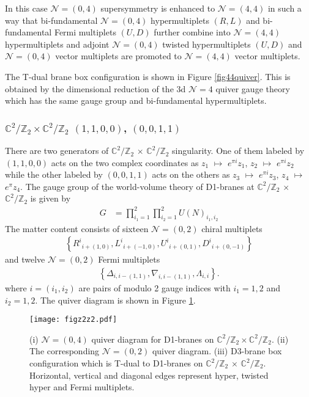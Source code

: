 \documentclass{article}
\numberwithin{equation}{section}
\begin{document}
In this case $\mathcal{N}=(0,4)$ supersymmetry is enhanced to $\mathcal{N}=(4,4)$ 
in such a way that  bi-fundamental $\mathcal{N}=(0,4)$ hypermultiplets 
$(R,L)$ and bi-fundamental Fermi multiplets $(U, D)$ further combine into $\mathcal{N}=(4,4)$ hypermultiplets 
and adjoint $\mathcal{N}=(0,4)$ twisted hypermultiplets $(U,D)$ and 
$\mathcal{N}=(0,4)$ vector multiplets are promoted to $\mathcal{N}=(4,4)$ vector multiplets. 

The T-dual brane box configuration is shown in Figure \ref{fig44quiver}. 
This is obtained by the dimensional reduction of the 3d $\mathcal{N}=4$ quiver gauge theory 
which has the same gauge group and bi-fundamental hypermultiplets. 








\subsubsection{$\mathbb{C}^{2}/\mathbb{Z}_{2}\times \mathbb{C}^{2}/\mathbb{Z}_{2}$ $(1,1,0,0)$, $(0,0,1,1)$}
\label{subsec_d1zkzk}
There are two generators of $\mathbb{C}^{2}/\mathbb{Z}_{2}$ 
$\times$ $\mathbb{C}^{2}/\mathbb{Z}_{2}$ singularity. 
One of them labeled by $(1,1,0,0)$ acts on the two complex coordinates as 
$z_{1}$ $\mapsto$ $e^{\pi i}z_{1}$, $z_{2}$ $\mapsto$ $e^{\pi i}z_{2}$ 
while the other labeled by $(0,0,1,1)$ acts on the others as
$z_{3}$ $\mapsto$ $e^{\pi i}z_{3}$, $z_{4}$ $\mapsto$ $e^{\pi} z_{4}$. 
The gauge group of the world-volume theory of D1-branes at $\mathbb{C}^{2}/\mathbb{Z}_{2}$ $\times$ 
$\mathbb{C}^{2}/\mathbb{Z}_{2}$ is given by 
\begin{align}
\label{z2z2_G}
G&=\prod_{i_{1}=1}^{2}\prod_{i_{2}=1}^{2}U(N)_{i_{1},i_{2}}
\end{align}
The matter content consists of sixteen $\mathcal{N}=(0,2)$ chiral multiplets
\begin{align}
\label{z2z2content}
\left\{
{R^{i}}_{i+(1,0)}, {L^{i}}_{i+(-1,0)}, {U^{i}}_{i+(0,1)}, {D^{i}}_{i+(0,-1)}
\right\}
\end{align}
and twelve $\mathcal{N}=(0,2)$ Fermi multiplets 
\begin{align}
\label{z2z2content}
\left\{
\Delta_{i,i-(1,1)}, \nabla_{i,i-(1,1)}, \Lambda_{i,i}
\right\}. 
\end{align}
where $i=(i_{1},i_{2})$ are pairs of modulo 2 gauge indices with $i_{1}=1,2$ and $i_{2}=1,2$. 
The quiver diagram is shown in Figure \ref{figz2z2}. 
\begin{figure}
\begin{center}
\texttt{[image: figz2z2.pdf]}
\caption{
(i) $\mathcal{N}=(0,4)$ quiver diagram for D1-branes on $\mathbb{C}^{2}/\mathbb{Z}_{2}\times \mathbb{C}^{2}/\mathbb{Z}_{2}$. 
(ii) The corresponding $\mathcal{N}=(0,2)$ quiver diagram. 
(iii) D3-brane box configuration which is T-dual to D1-branes on 
$\mathbb{C}^{2}/\mathbb{Z}_{2}$ $\times$ $\mathbb{C}^{2}/\mathbb{Z}_{2}$. 
Horizontal, vertical and diagonal edges represent hyper, twisted hyper and Fermi multiplets. 
}
\label{figz2z2}
\end{center}
\end{figure}
\end{document}
